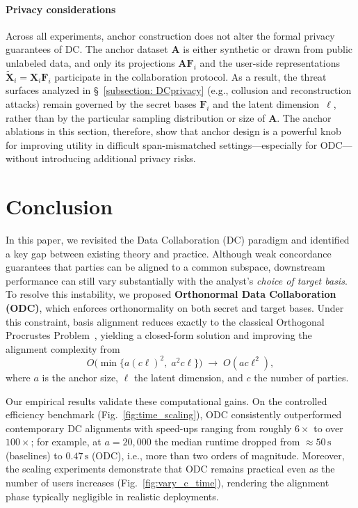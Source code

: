 \documentclass[final,3p,times]{elsarticle}
\theoremstyle{plain}
\newcommand{\matr}[1]{\bm{#1}}        %
\begin{document}
\paragraph{Privacy considerations}
Across all experiments, anchor construction does not alter the formal privacy guarantees of DC. The anchor dataset $\matr{A}$ is either synthetic or drawn from public unlabeled data, and only its projections $\matr{A}\matr{F}_i$ and the user-side representations $\tilde{\matr{X}}_i = \matr{X}_i\matr{F}_i$ participate in the collaboration protocol. As a result, the threat surfaces analyzed in \S~\ref{subsection: DCprivacy} (e.g., collusion and reconstruction attacks) remain governed by the secret bases $\matr{F}_i$ and the latent dimension~$\ell$, rather than by the particular sampling distribution or size of $\matr{A}$. The anchor ablations in this section, therefore, show that anchor design is a powerful knob for improving utility in difficult span-mismatched settings—especially for ODC—without introducing additional privacy risks.


\section{Conclusion}
\label{sec:conclusion}

In this paper, we revisited the Data Collaboration (DC) paradigm and identified a key gap between existing theory
and practice. Although weak concordance guarantees that parties can be aligned to a common subspace, downstream
performance can still vary substantially with the analyst’s \emph{choice of target basis}. To resolve this instability,
we proposed \textbf{Orthonormal Data Collaboration (ODC)}, which enforces orthonormality on both secret and
target bases. Under this constraint, basis alignment reduces exactly to the classical Orthogonal Procrustes
Problem~\cite{procrustessolution}, yielding a closed-form solution and improving the alignment complexity from
\begin{equation}
  O\bigl(\min\{a(c\ell)^2,\;a^2c\ell\}\bigr)
  \;\rightarrow\;
  O(ac\ell^2),
\end{equation}
where $a$ is the anchor size, $\ell$ the latent dimension, and $c$ the number of parties.

Our empirical results validate these computational gains. On the controlled efficiency benchmark (Fig.~\ref{fig:time_scaling}), ODC consistently outperformed contemporary DC alignments with speed-ups ranging from roughly $6\times$ to over $100\times$; for example, at $a=20{,}000$ the median runtime dropped from $\approx 50\,\mathrm{s}$ (baselines) to $0.47\,\mathrm{s}$ (ODC), i.e., more than two orders of magnitude. Moreover, the scaling experiments demonstrate that ODC remains practical even as the number of users increases (Fig.~\ref{fig:vary_c_time}), rendering the alignment phase typically negligible in realistic deployments.
\end{document}
